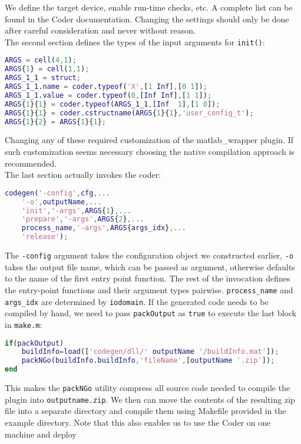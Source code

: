 \documentclass[11pt,a4paper,twoside]{article}
\newcommand{\+}{\discretionary{\mbox{\scriptsize$\hookleftarrow$}}{}{}}
\begin{document}
We define the target device, enable run-time checks, etc.
A complete list can be found in the \Matlab{} Coder documentation. Changing the
settings should only be done after careful consideration and never without
reason. \\
The second section defines the types of the input arguments for \texttt{init()}:
\begin{lstlisting}[language=Matlab]
%% Define argument types for entry-point 'init'.
ARGS = cell(4,1);
ARGS{1} = cell(1,1);
ARGS_1_1 = struct;
ARGS_1_1.name = coder.typeof('X',[1 Inf],[0 1]);
ARGS_1_1.value = coder.typeof(0,[Inf Inf],[1 1]);
ARGS{1}{1} = coder.typeof(ARGS_1_1,[Inf  1],[1 0]);
ARGS{1}{1} = coder.cstructname(ARGS{1}{1},'user_config_t');
ARGS{1}{2} = ARGS{1}{1};
\end{lstlisting}
Changing any of these required customization of the matlab\_wrapper plugin. If
such customization seems necessary choosing the native compilation approach is
recommended. \\
The last section actually invokes the \Matlab{} coder:
\begin{lstlisting}[language=Matlab]
codegen('-config',cfg,...
    '-o',outputName,...
    'init','-args',ARGS{1},...
    'prepare','-args',ARGS{2},...
    process_name,'-args',ARGS{args_idx},...
    'release');
\end{lstlisting}
The \texttt{-config} argument takes the configuration object we constructed
earlier, \texttt{-o} takes the output file name, which can be passed as
argument, otherwise defaults to the name of the first entry point function.
The rest of the invocation defines the entry-point functions and their argument
types pairwise. \texttt{process\_name} and \texttt{args\_idx} are determined by
\texttt{iodomain}.
If the generated code needs to be compiled by hand, we need to
pass \texttt{packOutput} as \texttt{true} to execute the last block in \texttt{make.m}:
\begin{lstlisting}[language=Matlab]
%% Optionally package the code for deployment elsewhere
if(packOutput)
    buildInfo=load(['codegen/dll/' outputName '/buildInfo.mat']);
    packNGo(buildInfo.buildInfo,'fileName',[outputName '.zip']);
end
\end{lstlisting}
This makes the \texttt{packNGo} utility compress all source code needed to compile
the plugin into \texttt{outputname.zip}.
We then can move the contents of the resulting zip file into a separate
directory and compile them using Makefile provided in the example directory.
Note that this also enables us to use the \Matlab{} Coder on one machine and deploy
\end{document}
